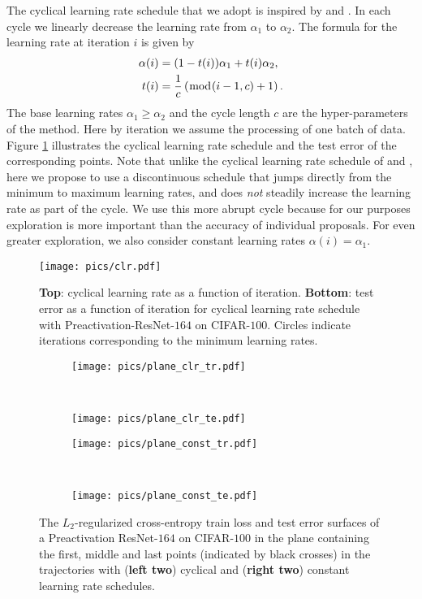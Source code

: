 \documentclass[letterpaper]{article}
\begin{document}
The cyclical learning rate schedule that we adopt is inspired by 
\citet{garipov2018} and \citet{smith2017exploring}. 
In each cycle we linearly decrease the learning rate from $\alpha_1$ to
$\alpha_2$. The formula for the learning rate
at iteration $i$ is given by
\begin{align}
    \notag
    \alpha(i) &= 
		(1 - t(i)) \alpha_1 + t(i) \alpha_2,\\
    \notag
    t(i) &= \frac 1 c \left (\bmod (i - 1, c) + 1 \right).
\end{align}
The base learning rates $\alpha_1 \ge \alpha_2$ and the cycle length $c$  are the hyper-parameters of 
the method. 
Here by iteration we assume the processing of one batch of data.
Figure \ref{fig:lr} illustrates the 
cyclical learning rate schedule and the test error of the corresponding points.
Note that unlike the cyclical learning rate schedule of 
\citet{garipov2018} and \citet{smith2017exploring}, here we propose to use a 
discontinuous schedule that jumps directly from the minimum to maximum learning 
rates, and does \emph{not} steadily increase the learning rate as part of 
the cycle.  We use this more abrupt cycle because for our purposes exploration
is more important than the accuracy of individual proposals. For even greater 
exploration, we also consider constant learning rates $\alpha(i) = \alpha_1$.


\begin{figure}[!t]
	\centering
	\texttt{[image: pics/clr.pdf]}
	\caption{
        \textbf{Top}: cyclical learning rate as a function of iteration. 
        \textbf{Bottom}: test error as a function of iteration
        for cyclical learning rate schedule with Preactivation-ResNet-$164$ on 
        CIFAR-$100$.
        Circles indicate iterations corresponding to the minimum learning rates.
    }
	\label{fig:lr}    	
\end{figure}

\begin{figure*}[!h]
	\centering
	\begin{subfigure}{0.24\textwidth}
    \texttt{[image: pics/plane\_clr\_tr.pdf]}
	\end{subfigure}
	~
	\begin{subfigure}{0.24\textwidth}
		\texttt{[image: pics/plane\_clr\_te.pdf]}
	\end{subfigure}
	\begin{subfigure}{0.24\textwidth}
		\texttt{[image: pics/plane\_const\_tr.pdf]}
	\end{subfigure}
	~
	\begin{subfigure}{0.24\textwidth}
		\texttt{[image: pics/plane\_const\_te.pdf]}
	\end{subfigure}
	\caption{
      The $L_2$-regularized cross-entropy train loss and test error 
      surfaces of a Preactivation ResNet-$164$
	    on CIFAR-$100$ in the plane containing the first, middle and last points (indicated by black crosses)
      in the trajectories with (\textbf{left two}) cyclical 
      and (\textbf{right two}) constant learning rate schedules.
  }
	\label{fig:loss_error_visualizations}
\end{figure*}
\end{document}
